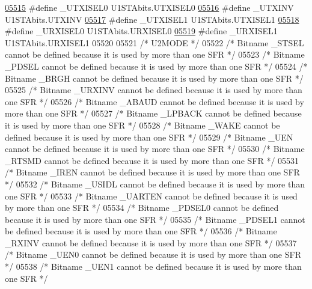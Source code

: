 \begin{DoxyCode}
\hypertarget{a00015_source_l05515}{}\hyperlink{a00015_a9d38dd91c66a8f4514a464fad2f65a85}{05515} \textcolor{preprocessor}{#define \_UTXISEL0 U1STAbits.UTXISEL0}
\hypertarget{a00015_source_l05516}{}\hyperlink{a00015_a3f14056df48953cc7f89998e40640758}{05516} \textcolor{preprocessor}{#define \_UTXINV U1STAbits.UTXINV}
\hypertarget{a00015_source_l05517}{}\hyperlink{a00015_ad8d65e38bef9dd4b92677b96bacafe61}{05517} \textcolor{preprocessor}{#define \_UTXISEL1 U1STAbits.UTXISEL1}
\hypertarget{a00015_source_l05518}{}\hyperlink{a00015_a24aae81f2c4406a8ce87b10991b11821}{05518} \textcolor{preprocessor}{#define \_URXISEL0 U1STAbits.URXISEL0}
\hypertarget{a00015_source_l05519}{}\hyperlink{a00015_af5ad1d270534c03075ab0471626063a1}{05519} \textcolor{preprocessor}{#define \_URXISEL1 U1STAbits.URXISEL1}
05520 
05521 \textcolor{comment}{/* U2MODE */}
05522 \textcolor{comment}{/* Bitname \_STSEL cannot be defined because it is used by more than one SFR */}
05523 \textcolor{comment}{/* Bitname \_PDSEL cannot be defined because it is used by more than one SFR */}
05524 \textcolor{comment}{/* Bitname \_BRGH cannot be defined because it is used by more than one SFR */}
05525 \textcolor{comment}{/* Bitname \_URXINV cannot be defined because it is used by more than one SFR */}
05526 \textcolor{comment}{/* Bitname \_ABAUD cannot be defined because it is used by more than one SFR */}
05527 \textcolor{comment}{/* Bitname \_LPBACK cannot be defined because it is used by more than one SFR */}
05528 \textcolor{comment}{/* Bitname \_WAKE cannot be defined because it is used by more than one SFR */}
05529 \textcolor{comment}{/* Bitname \_UEN cannot be defined because it is used by more than one SFR */}
05530 \textcolor{comment}{/* Bitname \_RTSMD cannot be defined because it is used by more than one SFR */}
05531 \textcolor{comment}{/* Bitname \_IREN cannot be defined because it is used by more than one SFR */}
05532 \textcolor{comment}{/* Bitname \_USIDL cannot be defined because it is used by more than one SFR */}
05533 \textcolor{comment}{/* Bitname \_UARTEN cannot be defined because it is used by more than one SFR */}
05534 \textcolor{comment}{/* Bitname \_PDSEL0 cannot be defined because it is used by more than one SFR */}
05535 \textcolor{comment}{/* Bitname \_PDSEL1 cannot be defined because it is used by more than one SFR */}
05536 \textcolor{comment}{/* Bitname \_RXINV cannot be defined because it is used by more than one SFR */}
05537 \textcolor{comment}{/* Bitname \_UEN0 cannot be defined because it is used by more than one SFR */}
05538 \textcolor{comment}{/* Bitname \_UEN1 cannot be defined because it is used by more than one SFR */}

\end{DoxyCode}
